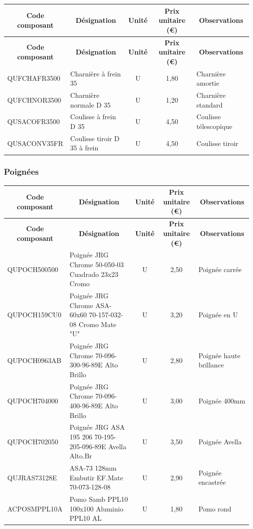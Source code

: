 \documentclass[12pt,a4paper]{article}
\begin{document}
\begin{longtable}{|p{4cm}|p{6cm}|c|c|p{3cm}|}
\hline
\multicolumn{1}{|c|}{\textbf{Code composant}} & \multicolumn{1}{c|}{\textbf{Désignation}} & \multicolumn{1}{c|}{\textbf{Unité}} & \multicolumn{1}{c|}{\textbf{Prix unitaire (€)}} & \multicolumn{1}{c|}{\textbf{Observations}} \\
\hline
\endfirsthead
\hline
\multicolumn{1}{|c|}{\textbf{Code composant}} & \multicolumn{1}{c|}{\textbf{Désignation}} & \multicolumn{1}{c|}{\textbf{Unité}} & \multicolumn{1}{c|}{\textbf{Prix unitaire (€)}} & \multicolumn{1}{c|}{\textbf{Observations}} \\
\hline
\endhead
\hline
\endfoot
QUFCHAFR3500 & Charnière à frein 35 & U & 1,80 & Charnière amortie \\
QUFCHNOR3500 & Charnière normale D 35 & U & 1,20 & Charnière standard \\
QUSACOFR3500 & Coulisse à frein D 35 & U & 4,50 & Coulisse télescopique \\
QUSACONV35FR & Coulisse tiroir D 35 à frein & U & 4,50 & Coulisse tiroir \\
\hline
\end{longtable}

\subsubsection{Poignées}

\begin{longtable}{|p{4cm}|p{6cm}|c|c|p{3cm}|}
\hline
\multicolumn{1}{|c|}{\textbf{Code composant}} & \multicolumn{1}{c|}{\textbf{Désignation}} & \multicolumn{1}{c|}{\textbf{Unité}} & \multicolumn{1}{c|}{\textbf{Prix unitaire (€)}} & \multicolumn{1}{c|}{\textbf{Observations}} \\
\hline
\endfirsthead
\hline
\multicolumn{1}{|c|}{\textbf{Code composant}} & \multicolumn{1}{c|}{\textbf{Désignation}} & \multicolumn{1}{c|}{\textbf{Unité}} & \multicolumn{1}{c|}{\textbf{Prix unitaire (€)}} & \multicolumn{1}{c|}{\textbf{Observations}} \\
\hline
\endhead
\hline
\endfoot
QUPOCH500500 & Poignée JRG Chrome 50-050-03 Cuadrado 23x23 Cromo & U & 2,50 & Poignée carrée \\
QUPOCH159CU0 & Poignée JRG Chrome ASA-60x60 70-157-032-08 Cromo Mate "U" & U & 3,20 & Poignée en U \\
QUPOCH0963AB & Poignée JRG Chrome 70-096-300-96-89E Alto Brillo & U & 2,80 & Poignée haute brillance \\
QUPOCH704000 & Poignée JRG Chrome 70-096-400-96-89E Alto Brillo & U & 3,00 & Poignée 400mm \\
QUPOCH702050 & Poignée JRG ASA 195 206 70-195-205-096-89E Avella Alto.Br & U & 3,50 & Poignée Avella \\
QUJRAS73128E & ASA-73 128mm Embutir EF.Mate 70-073-128-08 & U & 2,90 & Poignée encastrée \\
ACPOSMPPL10A & Pomo Samb PPL10 100x100 Aluminio PPL10 AL & U & 1,80 & Pomo rond \\
\hline
\end{longtable}
\end{document}
